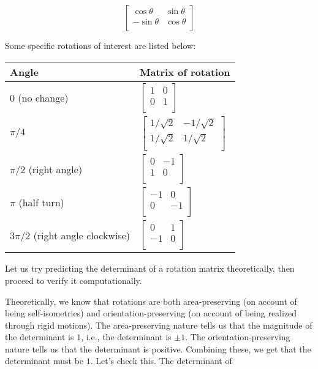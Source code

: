 \documentclass[10pt]{amsart}
\begin{document}
$$\left[\begin{matrix} \cos \theta & \sin \theta \\ -\sin \theta & \cos \theta \\\end{matrix}\right]$$

Some specific rotations of interest are listed below:

\begin{tabular}{|l|l|}
  \hline
  Angle & Matrix of rotation\\\hline
  $0$ (no change) & $\left[\begin{matrix} 1 & 0 \\ 0 & 1 \\\end{matrix}\right]$\\\hline
  $\pi/4$ & $\left[\begin{matrix} 1/\sqrt{2} & -1/\sqrt{2} \\ 1/\sqrt{2} & 1/\sqrt{2} \\\end{matrix}\right]$\\\hline
  $\pi/2$ (right angle)& $\left[\begin{matrix} 0 & -1 \\ 1 & 0 \\\end{matrix}\right]$\\\hline
  $\pi$ (half turn) & $\left[\begin{matrix} -1 & 0 \\ 0 & -1 \\\end{matrix}\right]$\\\hline
  $3\pi/2$ (right angle clockwise) & $\left[\begin{matrix} 0 & 1 \\ -1 & 0 \\\end{matrix}\right]$ \\\hline
\end{tabular}

Let us try predicting the determinant of a rotation matrix
theoretically, then proceed to verify it computationally.

Theoretically, we know that rotations are both area-preserving (on
account of being self-isometries) and orientation-preserving (on
account of being realized through rigid motions). The area-preserving
nature tells us that the magnitude of the determinant is $1$, i.e.,
the determinant is $\pm 1$. The orientation-preserving nature tells us
that the determinant is positive. Combining these, we get that the
determinant must be $1$. Let's check this. The determinant of
\end{document}
